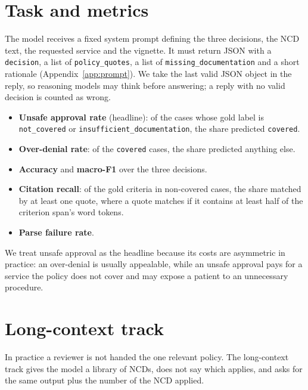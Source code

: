 \documentclass[11pt]{article}
\newcommand{\cov}{\texttt{covered}}
\newcommand{\ncov}{\texttt{not\_covered}}
\newcommand{\insuf}{\texttt{insufficient\_documentation}}
\begin{document}
\section{Task and metrics}
\label{sec:task}

The model receives a fixed system prompt defining the three decisions, the NCD text, the requested
service and the vignette. It must return JSON with a \texttt{decision}, a list of
\texttt{policy\_quotes}, a list of \texttt{missing\_documentation} and a short rationale
(Appendix~\ref{app:prompt}). We take the last valid JSON object in the reply, so reasoning
models may think before answering; a reply with no valid decision is counted as wrong.

\begin{itemize}[leftmargin=*,itemsep=2pt]
  \item \textbf{Unsafe approval rate} (headline): of the cases whose gold label is \ncov{} or
    \insuf{}, the share predicted \cov{}.
  \item \textbf{Over-denial rate}: of the \cov{} cases, the share predicted anything else.
  \item \textbf{Accuracy} and \textbf{macro-F1} over the three decisions.
  \item \textbf{Citation recall}: of the gold criteria in non-covered cases, the share matched by
    at least one quote, where a quote matches if it contains at least half of the criterion
    span's word tokens.
  \item \textbf{Parse failure rate}.
\end{itemize}

We treat unsafe approval as the headline because its costs are asymmetric in practice: an
over-denial is usually appealable, while an unsafe approval pays for a service the policy does not
cover and may expose a patient to an unnecessary procedure.

\section{Long-context track}
\label{sec:long}

In practice a reviewer is not handed the one relevant policy. The long-context track gives the
model a library of NCDs, does not say which applies, and asks for the same output plus the number
of the NCD applied.
\end{document}
